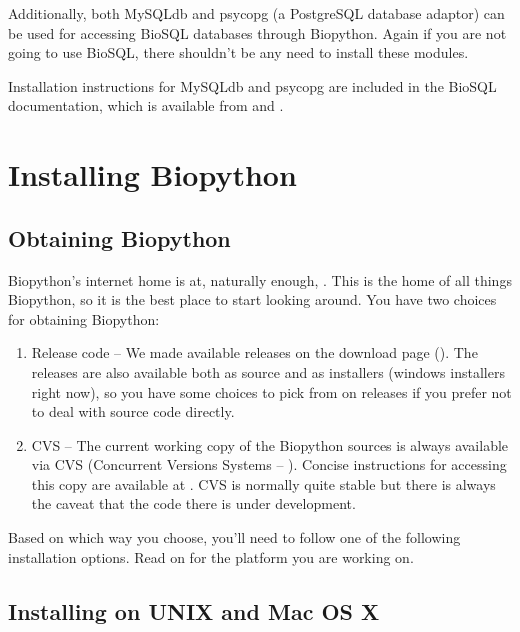 \documentclass{article}
\begin{document}
Additionally, both MySQLdb and psycopg (a PostgreSQL database adaptor)
can be used for accessing BioSQL databases through Biopython. Again if
you are not going to use BioSQL, there shouldn't be any need to install
these modules.


Installation instructions for MySQLdb and psycopg are included in the
BioSQL documentation, which is available from
 and
.

\section{Installing Biopython}

\subsection{Obtaining Biopython
}
Biopython's internet home is at, naturally enough,  
. This is the home of all things 
Biopython, so it is the best place to start looking around. 
You have two choices for obtaining Biopython:

\begin{enumerate}

\item Release code -- We made available releases on the download page 
(). 
The releases are also available both as source and as installers 
(windows installers right now), so you have some choices to pick from 
on releases if you prefer not to deal with source code directly.

\item CVS -- The current working copy of the Biopython sources is always
available via CVS (Concurrent Versions Systems --
). Concise instructions for
accessing this copy are available at
. CVS is normally quite stable
but there is always the caveat that the code there is under
development.

\end{enumerate}

Based on which way you choose, you'll need to follow one of the following installation options. Read on for the platform you are working on.

\subsection{Installing on UNIX and Mac OS X}
\label{sec:unix_install}
\end{document}
